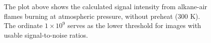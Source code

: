 \begin{figure}

\centering



\caption[- alkane-air flame results - I]{The plot above shows the calculated signal intensity from alkane-air flames burning at atmospheric pressure, without preheat (300 K). The ordinate \(1\times10^9\) serves as the lower threshold for images with usable signal-to-noise ratios.}

\label{fig:c1c3}

\end{figure}

